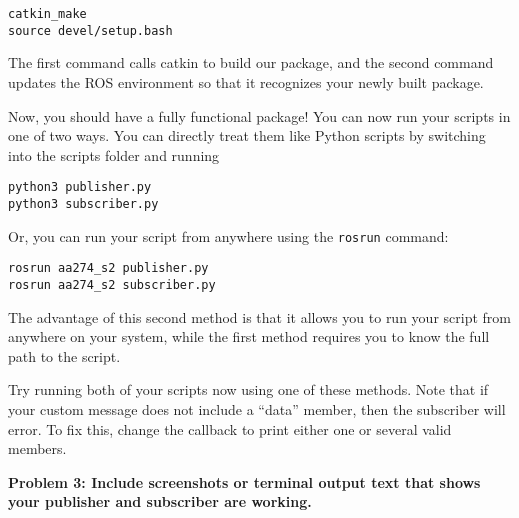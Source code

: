 \begin{lstlisting}
catkin_make
source devel/setup.bash
\end{lstlisting}

The first command calls catkin to build our package, and the second command updates the ROS environment so that it recognizes your newly built package.

Now, you should have a fully functional package! You can now run your scripts in one of two ways. You can directly treat them like Python scripts by switching into the scripts folder and running 

\begin{lstlisting}
python3 publisher.py
python3 subscriber.py
\end{lstlisting}

Or, you can run your script from anywhere using the \texttt{rosrun} command:

\begin{lstlisting}
rosrun aa274_s2 publisher.py
rosrun aa274_s2 subscriber.py
\end{lstlisting}
The advantage of this second method is that it allows you to run your script from anywhere on your system, while the first method requires you to know the full path to the script.

Try running both of your scripts now using one of these methods. Note that if your custom message does not include a ``data'' member, then the subscriber will error. To fix this, change the callback to print either one or several valid members.

\textbf{Problem 3: Include screenshots or terminal output text that shows your publisher and subscriber are working.}





